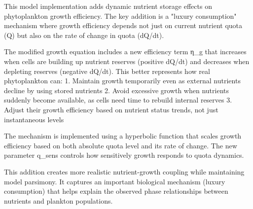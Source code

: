 This model implementation adds dynamic nutrient storage effects on phytoplankton growth efficiency. The key addition is a "luxury consumption" mechanism where growth efficiency depends not just on current nutrient quota (Q) but also on the rate of change in quota (dQ/dt).

The modified growth equation includes a new efficiency term η_g that increases when cells are building up nutrient reserves (positive dQ/dt) and decreases when depleting reserves (negative dQ/dt). This better represents how real phytoplankton can:
1. Maintain growth temporarily even as external nutrients decline by using stored nutrients
2. Avoid excessive growth when nutrients suddenly become available, as cells need time to rebuild internal reserves
3. Adjust their growth efficiency based on nutrient status trends, not just instantaneous levels

The mechanism is implemented using a hyperbolic function that scales growth efficiency based on both absolute quota level and its rate of change. The new parameter q_sens controls how sensitively growth responds to quota dynamics.

This addition creates more realistic nutrient-growth coupling while maintaining model parsimony. It captures an important biological mechanism (luxury consumption) that helps explain the observed phase relationships between nutrients and plankton populations.
